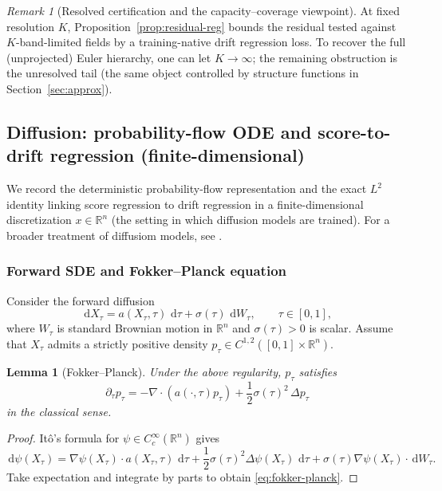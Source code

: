 \documentclass{article}
\numberwithin{equation}{section}
\theoremstyle{plain}
\newtheorem{lemma}[theorem]{Lemma}
\theoremstyle{definition}
\theoremstyle{remark}
\newtheorem{remark}[theorem]{Remark}
\newcommand{\R}{\mathbb{R}}
\newcommand{\dd}{\,\mathrm{d}}
\begin{document}
\begin{remark}[Resolved certification and the capacity--coverage viewpoint]
At fixed resolution $K$, Proposition~\ref{prop:residual-reg} bounds the residual tested against $K$-band-limited fields
by a training-native drift regression loss. To recover the full (unprojected) Euler hierarchy, one can let $K\to\infty$;
the remaining obstruction is the unresolved tail (the same object controlled by structure functions in Section~\ref{sec:approx}).
\end{remark}

\subsection{Diffusion: probability-flow ODE and score-to-drift regression (finite-dimensional)}
\label{subsec:pfode}

We record the deterministic probability-flow representation and the exact $L^2$ identity linking score regression
to drift regression in a finite-dimensional discretization $x\in\R^n$ (the setting in which diffusion models are trained). For a broader treatment of diffusiom models, see \cite{karras2022elucidating}.

\subsubsection{Forward SDE and Fokker--Planck equation}

Consider the forward diffusion
\begin{equation}\label{eq:fwd-sde}
\dd X_\tau = a(X_\tau,\tau)\,\dd\tau + \sigma(\tau)\,\dd W_\tau,\qquad \tau\in[0,1],
\end{equation}
where $W_\tau$ is standard Brownian motion in $\R^n$ and $\sigma(\tau)>0$ is scalar.
Assume that $X_\tau$ admits a strictly positive density $p_\tau\in C^{1,2}([0,1]\times\R^n)$.

\begin{lemma}[Fokker--Planck]\label{lem:fokker-planck}
Under the above regularity, $p_\tau$ satisfies
\begin{equation}\label{eq:fokker-planck}
\partial_\tau p_\tau = -\nabla\cdot(a(\cdot,\tau)p_\tau) + \frac12\sigma(\tau)^2\,\Delta p_\tau
\end{equation}
in the classical sense.
\end{lemma}

\begin{proof}
It\^o's formula for $\psi\in C_c^\infty(\R^n)$ gives
\[
\dd \psi(X_\tau)=\nabla\psi(X_\tau)\cdot a(X_\tau,\tau)\,\dd\tau + \frac12\sigma(\tau)^2\Delta\psi(X_\tau)\,\dd\tau
+ \sigma(\tau)\nabla\psi(X_\tau)\cdot \dd W_\tau.
\]
Take expectation and integrate by parts to obtain \eqref{eq:fokker-planck}.
\end{proof}
\end{document}
